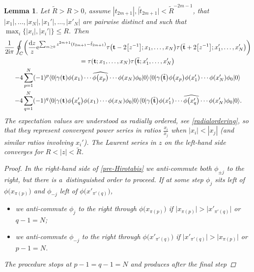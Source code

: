 \documentclass[10pt,a4paper]{amsart}
\numberwithin{equation}{section}
\newcommand{\dd}{\mathrm{d}}
\newtheorem{Lemma}[Theorem]{Lemma}
\begin{document}
\begin{Lemma}\label{lemmaRes}
Let $\tilde{R} >\! R >\! 0$, assume $|t_{2m+1}|,\bigl|\tilde{t}_{2m+1}\bigr|\!<\! \tilde{R}^{-2m-1}$, that $|x_1|,\dots,|x_N|,|x_1'|,\dots,|x'_N|$ are pairwise distinct and such that $\max_i\{|x_i|,|x_i'|\} \leq R$. Then
\begin{gather}
 \frac{1}{2{\rm i}\pi} \oint_{C} \biggl(\frac{\dd z}{z}
{\rm e}^{\sum_{m \geq 0} z^{2m+1}(t_{2m+1}-\tilde{t}_{2m+1})}
\tau\bigl(\mathbf{t}-2\bigl[z^{-1}\bigr];x_1,\dots,x_N\bigr)
\tau\bigl(\tilde{\mathbf{t}}+2\bigl[z^{-1}\bigr];x_1',\dots,x_N'\bigr)\biggr) \nonumber
\\
 =\tau(\mathbf{t};x_1,\dots,x_N)
\tau\bigl(\tilde{\mathbf{t}};x_1',\dots,x_N'\bigr) \nonumber
\\
 -4 \sum_{p=1}^N (-1)^p
\langle 0|\gamma(\mathbf{t}) \phi(x_1) \cdots \widehat{\phi\bigl(x_p\bigr)} \cdots
\phi(x_N) \phi_0|0\rangle
\langle 0|\gamma\bigl(\tilde{\mathbf{t}}\bigr) \phi\bigl(x_p\bigr) \phi(x_1')\cdots \phi(x_N')
\phi_0|0\rangle \nonumber
\\
 -4 \sum_{q=1}^N (-1)^q
\langle 0|\gamma(\mathbf{t}) \phi\bigl(x_q'\bigr)\phi(x_1)\cdots
\phi(x_N) \phi_0|0\rangle
\langle 0|\gamma\bigl(\tilde{\mathbf{t}}\bigr) \phi(x_1')
\cdots \widehat{\phi\bigl(x_q'\bigr)} \cdots \phi(x_N')
\phi_0|0\rangle.\!\label{pre-Hirota2}
\end{gather}
The expectation values are understood as radially
ordered, see \eqref{radialordering}, so that they represent convergent
power series in ratios $\frac{x_i}{x_j}$ when $|x_i|<|x_j|$
\big(and similar ratios involving $x_i'$\big). The Laurent series in $z$
on the left-hand side converges for $R < |z| <\tilde{R}$.
\begin{proof}
 In the right-hand side of \eqref{pre-Hirotabis}
 we anti-commute both $\phi_{\pm j}$ to the right, but there is
 a~distinguished order to proceed. If at some step $\phi_j$ sits left of
$\phi\bigl(x_{\pi(p)}\bigr)$ and
$\phi_{-j}$ left of $\phi\bigl(x'_{\pi'(q)}\bigr)$,
\begin{itemize}\itemsep=0pt
\item we anti-commute $\phi_j$ to the right through
$\phi\bigl(x_{\pi(p)}\bigr)$ if
$\bigl|x_{\pi(p)}\bigr|>\bigl|x'_{\pi'(q)}\bigr|$ or $q-1=N$;
\item we anti-commute $\phi_{-j}$ to the right
 through $\phi\bigl(x'_{\pi'(q)}\bigr)$ if
$\bigl|x'_{\pi'(q)}\bigr|>\bigl|x_{\pi(p)}\bigr|$ or $p-1=N$.
\end{itemize}
The procedure stops at $p{-}1=q{-}1=N$ and
produces after the final step

\end{proof}
\end{Lemma}
\end{document}
